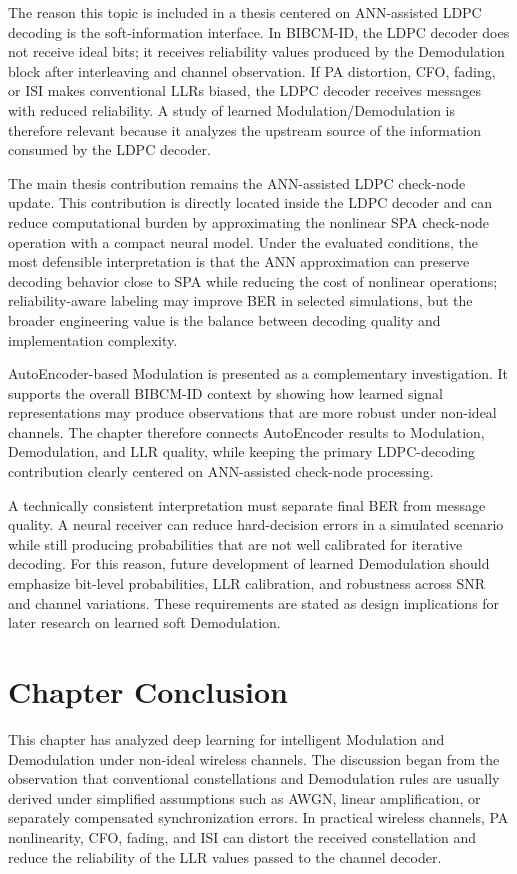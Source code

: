 The reason this topic is included in a thesis centered on ANN-assisted LDPC decoding is the soft-information interface. In BIBCM-ID, the LDPC decoder does not receive ideal bits; it receives reliability values produced by the Demodulation block after interleaving and channel observation. If PA distortion, CFO, fading, or ISI makes conventional LLRs biased, the LDPC decoder receives messages with reduced reliability. A study of learned Modulation/Demodulation is therefore relevant because it analyzes the upstream source of the information consumed by the LDPC decoder.

The main thesis contribution remains the ANN-assisted LDPC check-node update. This contribution is directly located inside the LDPC decoder and can reduce computational burden by approximating the nonlinear SPA check-node operation with a compact neural model. Under the evaluated conditions, the most defensible interpretation is that the ANN approximation can preserve decoding behavior close to SPA while reducing the cost of nonlinear operations; reliability-aware labeling may improve BER in selected simulations, but the broader engineering value is the balance between decoding quality and implementation complexity.

AutoEncoder-based Modulation is presented as a complementary investigation. It supports the overall BIBCM-ID context by showing how learned signal representations may produce observations that are more robust under non-ideal channels. The chapter therefore connects AutoEncoder results to Modulation, Demodulation, and LLR quality, while keeping the primary LDPC-decoding contribution clearly centered on ANN-assisted check-node processing.

A technically consistent interpretation must separate final BER from message quality. A neural receiver can reduce hard-decision errors in a simulated scenario while still producing probabilities that are not well calibrated for iterative decoding. For this reason, future development of learned Demodulation should emphasize bit-level probabilities, LLR calibration, and robustness across SNR and channel variations. These requirements are stated as design implications for later research on learned soft Demodulation.

\section{Chapter Conclusion}
This chapter has analyzed deep learning for intelligent Modulation and Demodulation under non-ideal wireless channels. The discussion began from the observation that conventional constellations and Demodulation rules are usually derived under simplified assumptions such as AWGN, linear amplification, or separately compensated synchronization errors. In practical wireless channels, PA nonlinearity, CFO, fading, and ISI can distort the received constellation and reduce the reliability of the LLR values passed to the channel decoder.

